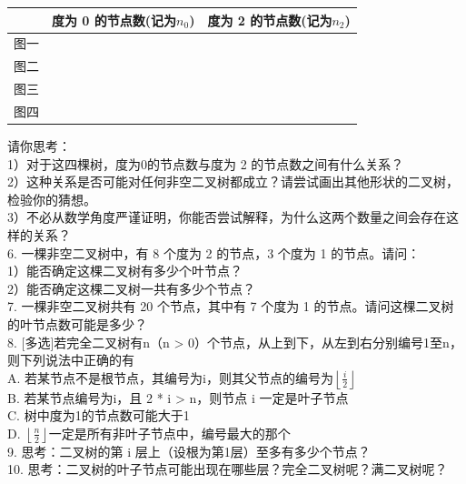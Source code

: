 \begin{exercise}
\begin{center}
    \begin{tabular}{|c|c|c|}
        \hline
         & 度为 0 的节点数(记为\(n_0\)) & 度为 2 的节点数(记为\(n_2\)) \\
        \hline
        图一 &  &  \\
        \hline
        图二 &  &  \\
        \hline
        图三 &  &  \\
        \hline
        图四 & & \\
        \hline
    \end{tabular}
\end{center}

请你思考：\\[0.8em]
1）对于这四棵树，度为0的节点数与度为 2 的节点数之间有什么关系？\\[0.5em]
2）这种关系是否可能对任何非空二叉树都成立？请尝试画出其他形状的二叉树，检验你的猜想。\\[0.5em]
3）不必从数学角度严谨证明，你能否尝试解释，为什么这两个数量之间会存在这样的关系？\\[0.5em]


6. 一棵非空二叉树中，有 8 个度为 2 的节点，3 个度为 1 的节点。请问：\\
1）能否确定这棵二叉树有多少个叶节点？\\[0.5em]
2）能否确定这棵二叉树一共有多少个节点？\\[0.5em]

7. 一棵非空二叉树共有 20 个节点，其中有 7 个度为 1 的节点。请问这棵二叉树的叶节点数可能是多少？\\


8. [多选]若完全二叉树有n（n > 0）个节点，从上到下，从左到右分别编号1至n，则下列说法中正确的有\underline{\hspace{1cm}}\\[0.5em]
A. 若某节点不是根节点，其编号为i，则其父节点的编号为$ \left\lfloor \frac{i}{2} \right\rfloor $ \\
B. 若某节点编号为i，且 2 * i > n，则节点 i 一定是叶子节点\\
C. 树中度为1的节点数可能大于1\\
D. $\left\lfloor \frac{n}{2} \right\rfloor $一定是所有非叶子节点中，编号最大的那个\\

9. 思考：二叉树的第 i 层上（设根为第1层）至多有多少个节点？\\

10. 思考：二叉树的叶子节点可能出现在哪些层？完全二叉树呢？满二叉树呢？\\


\end{exercise}
